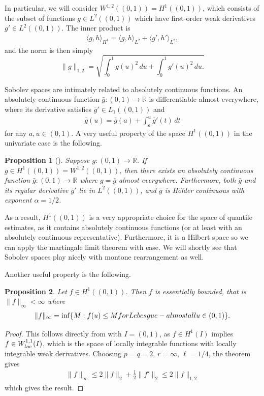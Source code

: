 \documentclass[11pt,a4paper]{article}
\newtheorem{prop}{Proposition}
\newcommand{\R}{\mathbb{R}}
\begin{document}
\begin{appendices}
In particular, we will consider $W^{1,2}((0,1)) = H^1((0,1))$, which consists of the subset of functions $g\in L^2((0,1))$ which have first-order weak derivatives $g' \in L^2((0,1))$. The inner product is
\begin{align*}
    \langle g,h \rangle_{H^1} = \langle g,h\rangle_{L^2} + \langle g',h'\rangle_{L^2},
\end{align*}
and the norm is then simply 
$$\|g\|_{1,2} = \sqrt{\int_0^1 g(u)^2\, du + \int_0^1 {g'(u)}^2\, du.}$$

Sobolev spaces are intimately related to absolutely continuous functions. An absolutely continuous function $\bar{g}:(0,1)\to \R$ is differentiable almost everywhere, where its derivative satisfies $\bar{g}' \in L_1((0,1))$ and 
\begin{align*}
    \bar{g}(u) = \bar{g}(a) + \int_a^u \bar{g}'(t)\, dt
\end{align*}
for any $a,u \in (0,1)$. A very useful property of the space $H^1((0,1))$ in the univariate case is the following. 
\begin{prop}[{\cite[Theorem 7.16]{Leoni2017}}]\label{app:prop_abcont}
    Suppose $g:(0,1) \to \R$. If $g\in H^1((0,1)) = W^{1,2}((0,1))$, then there exists an absolutely continuous function $\bar{g}:(0,1) \to \R$ where $g = \bar{g}$ almost everywhere.
    Furthermore, both $\bar{g}$ and its regular derivative $\bar{g}'$ lie in $L^2((0,1))$, and $\bar{g}$ is H{\"o}lder continuous with exponent $\alpha = 1/2$. 
\end{prop}
As a result, $H^1((0,1))$ is a very appropriate choice for the space of quantile estimates, as it contains absolutely continuous functions (or at least with an absolutely continuous representative). Furthermore, it is a Hilbert space so we can apply the martingale limit theorem with ease. We will shortly see that Sobolev spaces play nicely with montone rearrangement as well. 

Another useful property is the following.
\begin{prop}\label{app:prop_bounded}
    Let $f \in H^1((0,1))$. Then $f$ is essentially bounded, that is $\|f\|_{\infty} < \infty$ where
    \begin{align*}
      \|f\|_{\infty}  = \inf\{M: f(u) \leq M \textnormal{ for Lebesgue-almost all } u \in (0,1) \}.
    \end{align*}
\end{prop}
\begin{proof}
This follows directly from \citet[Theorem 7.34]{Leoni2017} with $I = (0,1)$, as $f \in H^1(I)$ implies $f \in W^{1,1}_{\textnormal{loc}}(I)$, which is the space of locally integrable functions with locally integrable weak derivatives. Choosing $p = q = 2$, $r = \infty$, $\ell = 1/4$, the theorem gives 
\begin{align*}
    \|f\|_{\infty} \leq 2\|f\|_{2} + \frac{1}{2}\|f'\|_{2} \leq 2\|f\|_{1,2}
\end{align*}
which gives the result.
\end{proof}


\end{appendices}
\end{document}
